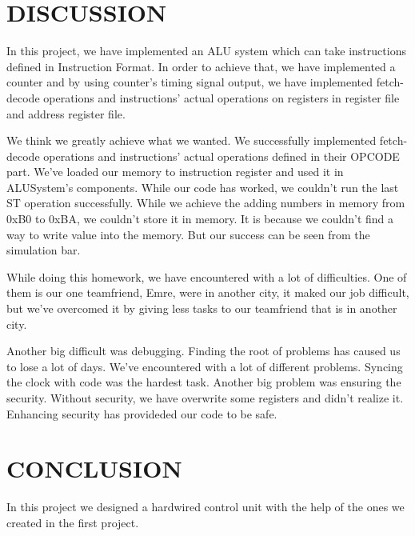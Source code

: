 \documentclass[pdftex,12pt,a4paper]{article}
\begin{document}
\section{DISCUSSION}
    In this project, we have implemented an ALU system which can take instructions defined in
Instruction Format. In order to achieve that, we have implemented a counter and by using counter's 
timing signal output, we have implemented fetch-decode operations and instructions' actual operations on
registers in register file and address register file. 

    We think we greatly achieve what we wanted. We successfully implemented fetch-decode operations
and instructions' actual operations defined in their OPCODE part. We've loaded our memory to instruction
register and used it in ALUSystem's components. While our code has worked, we couldn't run the last ST
operation successfully. While we achieve the adding numbers in memory from 0xB0 to 0xBA, we couldn't store it
in memory. It is because we couldn't find a way to write value into the memory. But our success can be seen
from the simulation bar.

    While doing this homework, we have encountered with a lot of difficulties. One of them is our one teamfriend, Emre,
were in another city, it maked our job difficult, but we've overcomed it by giving less tasks to our teamfriend
that is in another city.

    Another big difficult was debugging. Finding the root of problems has caused us to lose a lot of days.
We've encountered with a lot of different problems. Syncing the clock with code was the hardest task.
Another big problem was ensuring the security. Without security, we have overwrite some registers and
didn't realize it. Enhancing security has provideded our code to be safe. 






\section{CONCLUSION}
In this project we designed a hardwired control unit with the help of the ones we created in the first project. 
\end{document}
